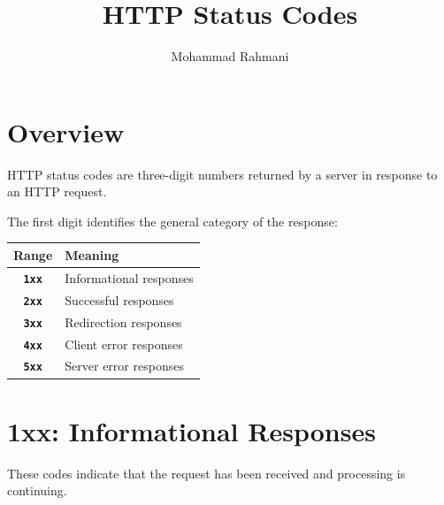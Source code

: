 \documentclass[a4paper]{article}
\title{HTTP Status Codes}
\date{}
\author{Mohammad Rahmani}
\newcommand{\httpcode}[1]{\texttt{\textbf{#1}}}
\begin{document}
    
    \maketitle
    
    \tableofcontents
    \newpage
    
    
    \section{Overview}
        
        HTTP status codes are three-digit numbers returned by a server in response
        to an HTTP request.
        
        The first digit identifies the general category of the response:
        
        \begin{center}
            \begin{tabular}{cl}
                \toprule
                \textbf{Range} & \textbf{Meaning}        \\
                \midrule
                \httpcode{1xx} & Informational responses \\
                \httpcode{2xx} & Successful responses    \\
                \httpcode{3xx} & Redirection responses   \\
                \httpcode{4xx} & Client error responses  \\
                \httpcode{5xx} & Server error responses  \\
                \bottomrule
            \end{tabular}
        \end{center}
    
    
    \section{1xx: Informational Responses}
        
        These codes indicate that the request has been received and processing is
        continuing.
        
\end{document}
